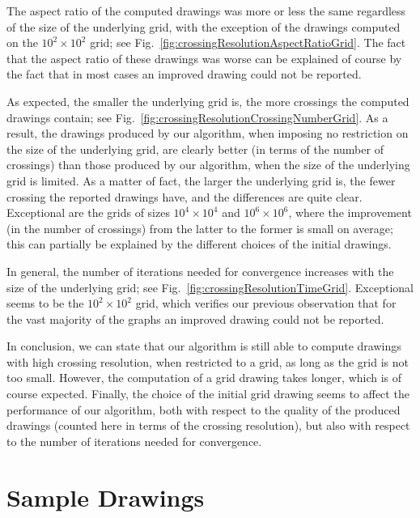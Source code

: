 \documentclass{comjnl}
\begin{document}
The aspect ratio of the computed drawings was more or less the same regardless of the size of the underlying grid, with the exception of the drawings computed on the $10^2 \times 10^2$ grid; see Fig.~\ref{fig:crossingResolutionAspectRatioGrid}. The fact that the aspect ratio of these drawings was worse can be explained of course by the fact that in most cases an improved drawing could not be reported.

As expected, the smaller the underlying grid is, the more crossings the computed drawings contain; see Fig.~\ref{fig:crossingResolutionCrossingNumberGrid}. As a result, the drawings produced by our algorithm, when imposing no restriction on the size of the underlying grid, are clearly better (in terms of the number of crossings) than those produced by our algorithm, when the size of the underlying grid is limited. As a matter of fact, the larger the underlying grid is, the fewer crossing the reported drawings have, and the differences are quite clear. Exceptional are the grids of sizes $10^4 \times 10^4$ and $10^6 \times 10^6$, where the improvement (in the number of crossings) from the latter to the former is small on average; this can partially be explained by the different choices of the initial drawings.

In general, the number of iterations needed for convergence increases with the size of the underlying grid; see Fig.~\ref{fig:crossingResolutionTimeGrid}. Exceptional seems to be the $10^2 \times 10^2$ grid, which verifies our previous observation that for the vast majority of the graphs an improved drawing could not be reported.

In conclusion, we can state that our algorithm is still able to compute drawings with high crossing resolution, when restricted to a grid, as long as the grid is not too small. However, the computation of a grid drawing takes longer, which is of course expected. Finally, the choice of the initial grid drawing seems to affect the performance of our algorithm, both with respect to the quality of the produced drawings (counted here in terms of the crossing resolution), but also with respect to the number of iterations needed for convergence.

\section{Sample Drawings}
\label{app:samples}
\end{document}
